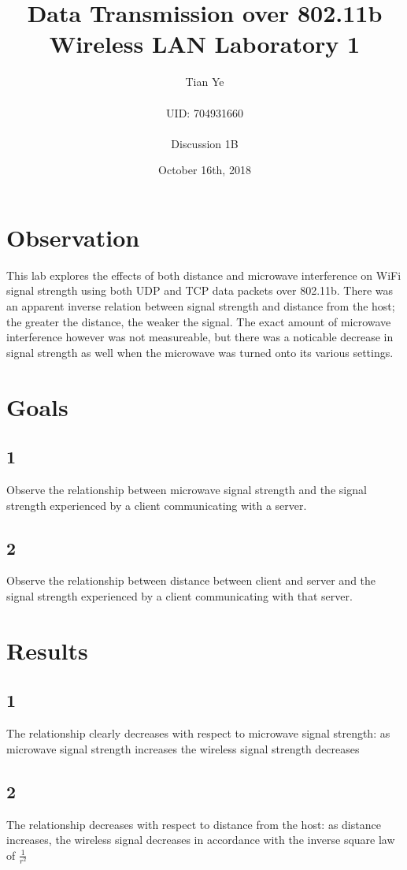 \documentclass[titlepage]{article}
\begin{document}
\title{Data Transmission over 802.11b Wireless LAN Laboratory 1}
\author{Tian Ye \\ \\ UID: 704931660 \\ \\ Discussion 1B}
\date{October 16th, 2018}

\maketitle

\section{Observation}
This lab explores the effects of both distance and microwave interference on WiFi signal strength using both UDP and TCP data packets over 802.11b. There was an apparent inverse relation between signal strength and distance from the host; the greater the distance, the weaker the signal. The exact amount of microwave interference however was not measureable, but there was a noticable decrease in signal strength as well when the microwave was turned onto its various settings. \\

\section*{Goals}
\subsection*{1}
Observe the relationship between microwave signal strength and the signal strength experienced by a client communicating with a server.
\subsection*{2}
Observe the relationship between distance between client and server and the signal strength experienced by a client communicating with that server.

\section*{Results}
\subsection*{1}
The relationship clearly decreases with respect to microwave signal strength: as microwave signal strength increases the wireless signal strength decreases
\subsection*{2}
The relationship decreases with respect to distance from the host: as distance increases, the wireless signal decreases in accordance with the inverse square law of $\frac{1}{r^2}$
\end{document}
